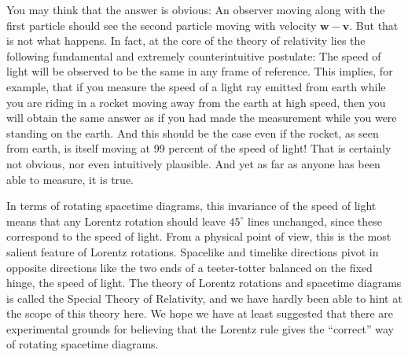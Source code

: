 \documentclass{book}
\begin{document}
You may think that the answer is obvious: An observer moving along
with the first particle should see the second particle moving with velocity
$\mathbf{w} - \mathbf{v}$. But that is not what happens. In fact, at the core of the theory of
relativity lies the following fundamental and extremely counterintuitive
postulate: The speed of light will be observed to be the same in any
frame of reference. This implies, for example, that if you measure the
speed of a light ray emitted from earth while you are riding in a rocket
moving away from the earth at high speed, then you will obtain the same
answer as if you had made the measurement while you were standing
on the earth. And this should be the case even if the rocket, as seen
from earth, is itself moving at 99 percent of the speed of light! That is
certainly not obvious, nor even intuitively plausible. And yet as far as
anyone has been able to measure, it is true.

In terms of rotating spacetime diagrams, this invariance of the speed of
light means that any Lorentz rotation should leave $45^{\circ}$ lines unchanged,
since these correspond to the speed of light. From a physical point of
view, this is the most salient feature of Lorentz rotations. Spacelike and
timelike directions pivot in opposite directions like the two ends of a
teeter-totter balanced on the fixed hinge, the speed of light.
The theory of Lorentz rotations and spacetime diagrams is called the
Special Theory of Relativity, and we have hardly been able to hint at
the scope of this theory here. We hope we have at least suggested that
there are experimental grounds for believing that the Lorentz rule gives
the ``correct'' way of rotating spacetime diagrams.
\end{document}
